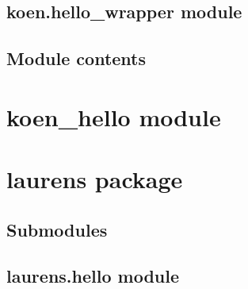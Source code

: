\documentclass[letterpaper,10pt,english]{sphinxmanual}
\begin{document}
\subsection{koen.hello\_wrapper module}
\label{\detokenize{koen:koen-hello-wrapper-module}}

\subsection{Module contents}
\label{\detokenize{koen:module-koen}}\label{\detokenize{koen:module-contents}}

\section{koen\_hello module}
\label{\detokenize{koen_hello:module-koen_hello}}\label{\detokenize{koen_hello:koen-hello-module}}\label{\detokenize{koen_hello::doc}}

\section{laurens package}
\label{\detokenize{laurens:laurens-package}}\label{\detokenize{laurens::doc}}

\subsection{Submodules}
\label{\detokenize{laurens:submodules}}

\subsection{laurens.hello module}
\label{\detokenize{laurens:module-laurens.hello}}\label{\detokenize{laurens:laurens-hello-module}}
\end{document}
